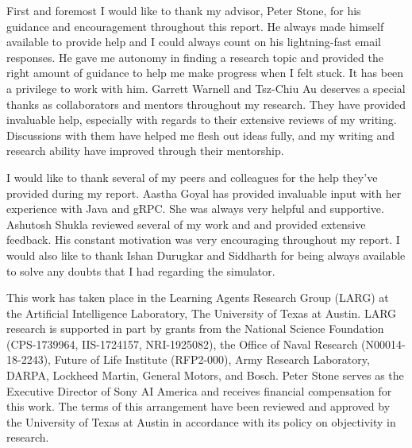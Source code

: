 \documentclass[12pt]{report}
\begin{document}
\justify 
\noindent

\thesiscopyrightpage                 

\thesiscertificationpage             

\thesistitlepage                     



\begin{thesisacknowledgments}       
First and foremost I would like to thank my advisor, Peter Stone, for his guidance and encouragement throughout this report. He always made himself available to provide help and I could always count on his lightning-fast email responses. He gave me autonomy in finding a research topic and provided the right amount of guidance to help me make progress when I felt stuck. It has been a privilege to work with him. Garrett Warnell and Tsz-Chiu Au deserves a special thanks as collaborators and mentors throughout my research. They have provided invaluable help, especially with regards to their extensive reviews of my writing. Discussions with them have helped me flesh out ideas fully, and my writing and research ability have improved through their mentorship.    

I would like to thank several of my peers and colleagues for the help they’ve provided during my report. Aastha Goyal has provided invaluable input with her experience with Java and gRPC. She was always very helpful and supportive. Ashutosh Shukla reviewed several of my work and and provided extensive feedback. His constant motivation was very encouraging throughout my report. I would also like to thank Ishan Durugkar and Siddharth for being always available to solve any doubts that I had regarding the simulator. 

This work has taken place in the Learning Agents Research Group (LARG) at the Artificial Intelligence Laboratory, The University of Texas at Austin.  LARG research is supported in part by grants from
the National Science Foundation (CPS-1739964, IIS-1724157, NRI-1925082), the Office of Naval Research (N00014-18-2243), Future of Life Institute (RFP2-000), Army Research Laboratory, DARPA, Lockheed
Martin, General Motors, and Bosch.  Peter Stone serves as the Executive Director of Sony AI America and receives financial compensation for this work.  The terms of this arrangement have been reviewed and approved by the University of Texas at Austin in accordance with its policy on objectivity in research. 

\end{thesisacknowledgments}          
\end{document}
